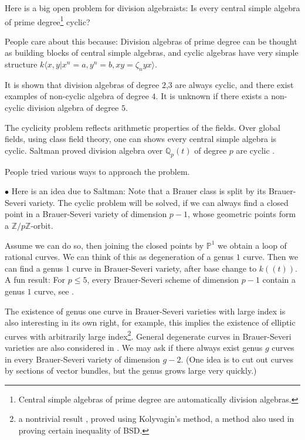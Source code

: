 \documentclass[8pt]{amsart}
\begin{document}
Here is a big open problem for division algebraists: Is every central simple algebra of prime degree\footnote{Central simple algebras of prime degree are automatically division algebras.} cyclic?

People care about this because: Division algebras of prime degree can be thought as building blocks of central simple algebras, and cyclic algebras have very simple structure $k\langle x,y|x^n=a,y^n=b,xy=\zeta_nyx\rangle$.

It is shown that division algebras of degree $2$,$3$ are always cyclic, and there exist examples of non-cyclic algebra of degree $4$. It is unknown if there exists a non-cyclic division algebra of degree $5$.

The cyclicity problem reflects arithmetic properties of the fields. Over global fields, using class field theory, one can shows every central simple algebra is cyclic. Saltman proved division algebra over $\mathbb{Q}_p(t)$ of degree $p$ are cyclic \cite{Salt}.


People tried various ways to approach the problem.

$\bullet$ Here is an idea due to Saltman: Note that a Brauer class is split by its Brauer-Severi variety. The cyclic problem will be solved, if we can always find a closed point in a Brauer-Severi variety of dimension $p-1$, whose geometric points form a $\mathbb{Z}/p\mathbb{Z}$-orbit.

Assume we can do so, then joining the closed points by $\mathbb{P}^1$ we obtain a loop of rational curves. We can think of this as degeneration of a genus $1$ curve. Then we can find a genus $1$ curve in Brauer-Severi variety, after base change to $k((t))$.
A fun result: For $p\leq5$, every Brauer-Severi scheme of dimension $p-1$ contain a genus $1$ curve, see \cite{dJ}.

The existence of genus one curve in Brauer-Severi varieties with large index is also interesting in its own right, for example, this implies the existence of elliptic curves with arbitrarily large index\footnote{a nontrivial result \cite{Stein}, proved using Kolyvagin's method, a method also used in proving certain inequality of BSD.}. General degenerate curves in Brauer-Severi varieties are also considered in \cite{KollarB}. We may ask if there always exist genus $g$ curves in every Brauer-Severi variety of dimension $g-2$. (One idea is to cut out curves by sections of vector bundles, but the genus grows large very quickly.)
\end{document}
